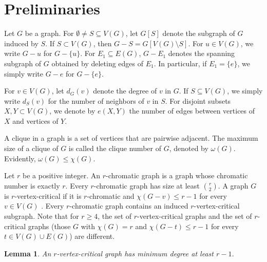 \documentclass[12pt]{article}
\newtheorem{lemma}{Lemma}[section]
\begin{document}
\section{Preliminaries}

Let $G$ be a graph. For $\emptyset\ne S\subseteq V(G)$, let $G[S]$ denote the subgraph of $G$ induced by $S$. If $S\subset V(G)$, then $G-S=G[V(G)\setminus S]$.
For $u\in V(G)$, we write $G-u$ for $G-\{u\}$. 
For $E_1\subseteq E(G)$, $G-E_1$ denotes the spanning subgraph of $G$ obtained by deleting edges of $E_1$. In particular, if $E_1=\{e\}$, we simply write $G-e$ for $G-\{e\}$.


For $v\in V(G)$, let $d_G(v)$ denote the degree of $v$ in $G$. If $S\subseteq V(G)$, we  simply write $d_S(v)$ for the number of neighbors of $v$ in $S$. %
For disjoint subsets $X,Y\subset V(G)$, we denote by $e(X,Y)$ the number of edges between vertices of $X$ and vertices of $Y$.

 
A clique in a graph is a set of vertices that are pairwise adjacent. The maximum size of a clique of $G$ is called the clique number of $G$, denoted by $\omega(G)$. Evidently, $\omega(G)\le \chi(G)$. 

Let $r$ be a positive integer. An $r$-chromatic graph is a graph whose chromatic number is exactly $r$. Every $r$-chromatic graph has size at least ${r\choose 2}$. 
A graph $G$ is $r$-vertex-critical if it is $r$-chromatic and  
$\chi(G-v)\le r-1$ for every $v\in V(G)$ \cite{Jen}.  
Every $r$-chromatic graph contains an induced
$r$-vertex-critical subgraph. 
Note that  for $r\ge 4$, the set of  $r$-vertex-critical graphs and the  set of $r$-critical graphs (those $G$ with $\chi (G)=r$ and  $\chi(G-t)\le r-1$ for every $t\in V(G)\cup E(G)$) are different.




%
%

\begin{lemma}\label{edge} \cite{Jen}
An $r$-vertex-critical graph has minimum degree at least $r-1$.  
\end{lemma}


\end{document}
